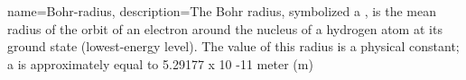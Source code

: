 {
    name=Bohr-radius,
    description={The Bohr radius, symbolized a , is the mean radius of the orbit of an electron around the nucleus of a hydrogen atom at its ground state (lowest-energy level). The value of this radius is a physical constant; a is approximately equal to 5.29177 x 10 -11 meter (m)}
}
